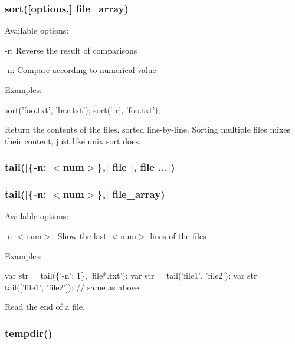 \subsubsection*{sort(\mbox{[}options,\mbox{]} file\+\_\+array)}

Available options\+:


\begin{DoxyItemize}
\item {\ttfamily -\/r}\+: Reverse the result of comparisons
\item {\ttfamily -\/n}\+: Compare according to numerical value
\end{DoxyItemize}

Examples\+:


\begin{DoxyCode}
sort('foo.txt', 'bar.txt');
sort('-r', 'foo.txt');
\end{DoxyCode}


Return the contents of the files, sorted line-\/by-\/line. Sorting multiple files mixes their content, just like unix sort does.

\subsubsection*{tail(\mbox{[}\{\textquotesingle{}-\/n\textquotesingle{}\+: $<$num$>$\},\mbox{]} file \mbox{[}, file ...\mbox{]})}

\subsubsection*{tail(\mbox{[}\{\textquotesingle{}-\/n\textquotesingle{}\+: $<$num$>$\},\mbox{]} file\+\_\+array)}

Available options\+:


\begin{DoxyItemize}
\item {\ttfamily -\/n $<$num$>$}\+: Show the last {\ttfamily $<$num$>$} lines of the files
\end{DoxyItemize}

Examples\+:


\begin{DoxyCode}
var str = tail(\{'-n': 1\}, 'file*.txt');
var str = tail('file1', 'file2');
var str = tail(['file1', 'file2']); // same as above
\end{DoxyCode}


Read the end of a file.

\subsubsection*{tempdir()}


